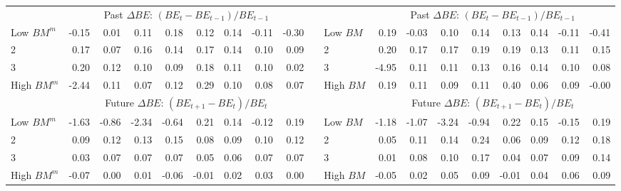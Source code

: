 \begin{table}[ht]
\begin{tabular}{lrrrrrrrrllrrrrrrrr}
                 & \multicolumn{8}{c}{Past $\Delta BE$: $(BE_t - BE_{t-1}) / BE_{t-1}$}  & &             & \multicolumn{8}{c}{Past $\Delta BE$: $(BE_t - BE_{t-1}) / BE_{t-1}$} \\
    Low $BM^m$   & -0.15  &  0.01  &  0.11  &  0.18  &  0.12  &  0.14  & -0.11  & -0.30  & &  Low $BM$   &  0.19  & -0.03  &  0.10  &  0.14  &  0.13  &  0.14  & -0.11  & -0.41  \\
             2   &  0.17  &  0.07  &  0.16  &  0.14  &  0.17  &  0.14  &  0.10  &  0.09  & &         2   &  0.20  &  0.17  &  0.17  &  0.19  &  0.19  &  0.13  &  0.11  &  0.15  \\
             3   &  0.20  &  0.12  &  0.10  &  0.09  &  0.18  &  0.11  &  0.10  &  0.02  & &         3   & -4.95  &  0.11  &  0.11  &  0.13  &  0.16  &  0.14  &  0.10  &  0.08  \\
    High $BM^m$  & -2.44  &  0.11  &  0.07  &  0.12  &  0.29  &  0.10  &  0.08  &  0.07  & &  High $BM$  &  0.19  &  0.11  &  0.09  &  0.11  &  0.40  &  0.06  &  0.09  & -0.00  \\
    [1em]
  

                 & \multicolumn{8}{c}{Future $\Delta BE$: $(BE_{t+1} - BE_t) / BE_t$}    & &             & \multicolumn{8}{c}{Future $\Delta BE$: $(BE_{t+1} - BE_t) / BE_t$} \\
    Low $BM^m$   & -1.63  & -0.86  & -2.34  & -0.64  &  0.21  &  0.14  & -0.12  &  0.19  & &  Low $BM$   & -1.18  & -1.07  & -3.24  & -0.94  &  0.22  &  0.15  & -0.15  &  0.19  \\
             2   &  0.09  &  0.12  &  0.13  &  0.15  &  0.08  &  0.09  &  0.10  &  0.12  & &         2   &  0.05  &  0.11  &  0.14  &  0.24  &  0.06  &  0.09  &  0.12  &  0.18  \\
             3   &  0.03  &  0.07  &  0.07  &  0.07  &  0.05  &  0.06  &  0.07  &  0.07  & &         3   &  0.01  &  0.08  &  0.10  &  0.17  &  0.04  &  0.07  &  0.09  &  0.14  \\
    High $BM^m$  & -0.07  &  0.00  &  0.01  & -0.06  & -0.01  &  0.02  &  0.03  &  0.00  & &  High $BM$  & -0.05  &  0.02  &  0.05  &  0.09  & -0.01  &  0.04  &  0.06  &  0.09  \\
    [1em]
  

  \bottomrule
\end{tabular}
\label{tbl:32_Size_BM_Prior_Sorts}
\end{table}